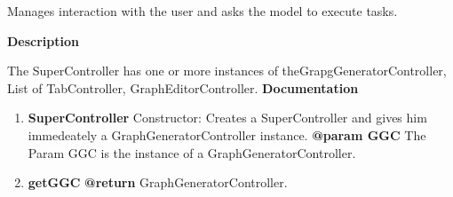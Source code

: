 
Manages interaction with the user and asks the model to execute tasks. 


\textbf{Description}

The SuperController has one or more instances of theGrapgGeneratorController, List of TabController, GraphEditorController. \newline
\textbf{Documentation}
\begin{enumerate}[+]
	\item{
	\textbf{SuperController} \newline
	Constructor: Creates a SuperController and gives him immedeately a GraphGeneratorController instance.  \newline
	\textbf{@param GGC} The Param GGC is the instance of a GraphGeneratorController. \newline
	}

	\item{
	\textbf{getGGC} \newline
	\textbf{@return} GraphGeneratorController. \newline

}
\end{enumerate}
